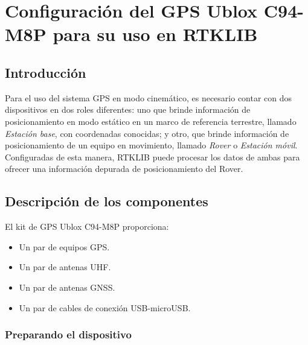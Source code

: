 
\chapter{Configuración del GPS Ublox C94-M8P para su uso en RTKLIB}\label{Anx:ublox}
\section{Introducción}
Para el uso del sistema GPS en modo cinemático, es necesario contar con dos dispositivos en dos roles diferentes: uno que brinde información de posicionamiento en modo estático en un marco de referencia terrestre, llamado \textit{Estación base}, con coordenadas conocidas; y otro, que brinde información de posicionamiento de un equipo en movimiento, llamado \textit{Rover} o \textit{Estación móvil}.\\

Configuradas de esta manera, RTKLIB puede procesar los datos de ambas para ofrecer una información depurada de posicionamiento del Rover.  


\section{Descripción de los componentes}\label{sec:Desc}
El kit de GPS Ublox C94-M8P proporciona:

\begin{itemize}
\item Un par de equipos GPS.
\item Un par de antenas UHF.
\item Un par de antenas GNSS.
\item Un par de cables de conexión USB-microUSB. 
\end{itemize}


\subsection{Preparando el dispositivo} %


